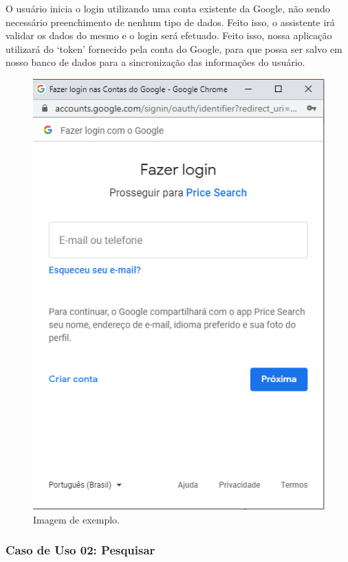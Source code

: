 O usuário inicia o login utilizando uma conta existente da Google, não sendo necessário preenchimento de nenhum tipo de dados. Feito isso, o assistente irá validar os dados do mesmo e o login será efetuado. Feito isso, nossa aplicação utilizará do ‘token’ fornecido pela conta do Google, para que possa ser salvo em nosso banco de dados para a sincronização das informações do usuário.

\begin{figure}[!htb]
\centering
\caption{Imagem de exemplo.}
\includegraphics[width=\linewidth]{figuras/tela-login.png}
\end{figure}

\subsubsection{Caso de Uso 02: Pesquisar}

